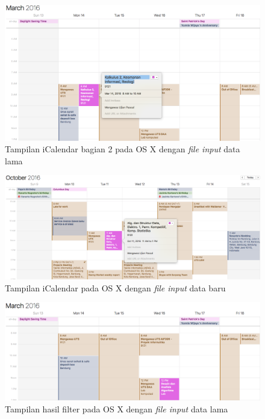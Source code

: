 			\begin{figure}[H]
			\centering
			\includegraphics[scale=0.4]{Gambar/Hasil-Import-2-on-Mac}
			\caption{Tampilan iCalendar bagian 2 pada OS X dengan \textit{file input} data lama}
			\label{fig:Hasil-Import-2-on-Mac}
			\end{figure}
			
			\begin{figure}[H]
			\centering
			\includegraphics[scale=0.3]{Gambar/Hasil-iCal-Data-Baru-on-Mac}
			\caption{Tampilan iCalendar  pada OS X dengan \textit{file input} data baru}
			\label{fig:Hasil-iCal-Data-Baru-on-Mac}
			\end{figure}
			
			\begin{figure}[H]
			\centering
			\includegraphics[scale=0.4]{Gambar/Hasil-Import-Filter-on-Mac}
			\caption{Tampilan hasil filter pada OS X dengan \textit{file input} data lama}
			\label{fig:Hasil-Import-Filter-on-Mac}
			\end{figure}
			
